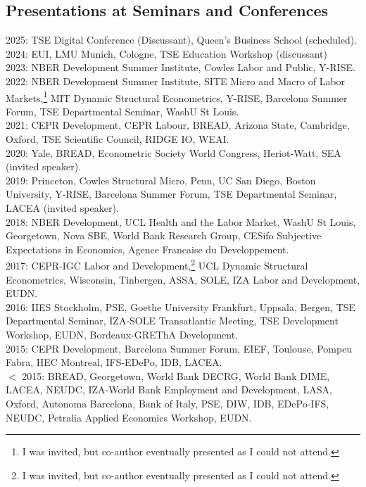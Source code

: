\documentclass[12pt,english]{article}
\begin{document}
\subsection*{Presentations at Seminars and Conferences}
2025: TSE Digital Conference (Discussant), Queen's Business School (scheduled). \vspace{0.2cm} \\
2024:  EUI, LMU Munich, Cologne, TSE Education Workshop (discussant) \vspace{0.2cm} \\
2023: NBER Development Summer Institute, Cowles Labor and Public, Y-RISE.\vspace{0.2cm} \\
2022: NBER Development Summer Institute, SITE Micro and Macro of Labor Markets,\footnote{I was invited, but co-author eventually presented as I could not attend.} MIT Dynamic Structural Econometrics, Y-RISE, Barcelona Summer Forum, TSE Departmental Seminar, WashU St Louis.\vspace{0.2cm} \\
2021: CEPR Development, CEPR Labour, BREAD, Arizona State, Cambridge, Oxford, TSE Scientific Council, RIDGE IO, WEAI.\vspace{0.2cm} \\
2020: Yale, BREAD, Econometric Society World Congress, Heriot-Watt, SEA (invited speaker). \vspace{0.2cm} \\
2019: Princeton, Cowles Structural Micro, Penn, UC San Diego, Boston University, Y-RISE, Barcelona Summer Forum, TSE Departmental Seminar, LACEA (invited speaker).\vspace{0.2cm} \\
2018: NBER Development, UCL Health and the Labor Market, WashU St Louis, Georgetown, Nova SBE, World Bank Research Group, CESifo Subjective Expectations in Economics, Agence Francaise du Developpement. \vspace{0.2cm} \\
2017: CEPR-IGC Labor and Development,\footnote{I was invited, but co-author eventually presented as I could not attend.} UCL Dynamic Structural Econometrics, Wisconsin, Tinbergen, ASSA, SOLE, IZA Labor and Development, EUDN.\vspace{0.2cm} \\
2016: IIES Stockholm, PSE, Goethe University Frankfurt, Uppsala, Bergen, TSE Departmental Seminar, IZA-SOLE Transatlantic Meeting, TSE Development Workshop, EUDN, Bordeaux-GREThA Development.\vspace{0.2cm} \\
2015:  CEPR Development, Barcelona Summer Forum, EIEF, Toulouse, Pompeu Fabra, HEC Montreal, IFS-EDePo, IDB, LACEA.  \vspace{0.2cm} \\
$<$ 2015: BREAD, Georgetown, World Bank DECRG, World Bank DIME, LACEA, NEUDC, IZA-World Bank Employment and Development, LASA, Oxford, Autonoma Barcelona, Bank of Italy, PSE, DIW, IDB, EDePo-IFS, NEUDC, Petralia Applied Economics Workshop, EUDN.  
\end{document}
